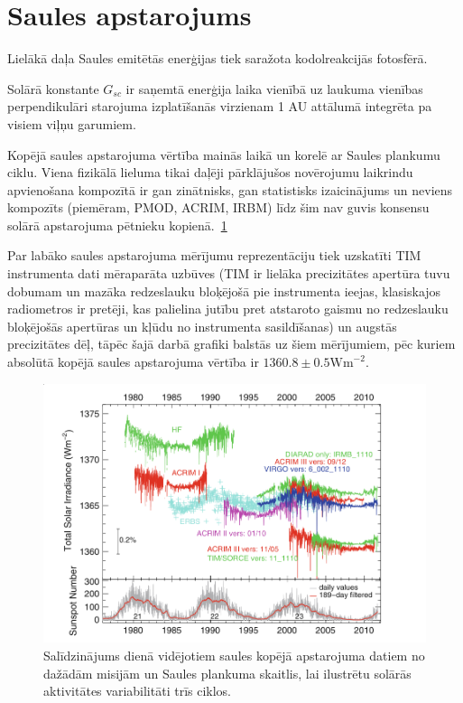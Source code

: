 
\section{Saules apstarojums}

Lielākā daļa Saules emitētās enerģijas tiek saražota kodolreakcijās fotosfērā.


Solārā konstante $G_{sc}$ ir saņemtā enerģija laika vienībā uz laukuma vienības perpendikulāri starojuma izplatīšanās virzienam 1 AU attālumā integrēta pa visiem viļņu garumiem.\cite{ThermalProcesses}

Kopējā saules apstarojuma vērtība mainās laikā un korelē ar Saules plankumu ciklu.
Viena fizikālā lieluma tikai daļēji pārklājušos novērojumu laikrindu apvienošana kompozītā ir gan zinātnisks, gan statistisks izaicinājums un neviens kompozīts (piemēram, PMOD, ACRIM, IRBM) līdz šim nav guvis konsensu solārā apstarojuma pētnieku kopienā.~\ref{fig:TSI_misijas}

Par labāko saules apstarojuma mērījumu reprezentāciju tiek uzskatīti TIM instrumenta dati mēraparāta uzbūves (TIM ir lielāka precizitātes apertūra tuvu dobumam un mazāka redzeslauku bloķējošā pie instrumenta ieejas, klasiskajos radiometros ir pretēji, kas palielina jutību pret atstaroto gaismu no redzeslauku bloķējošās apertūras un kļūdu no instrumenta sasildīšanas) un augstās precizitātes dēļ, tāpēc šajā darbā grafiki balstās uz šiem mērījumiem, pēc kuriem absolūtā kopējā saules apstarojuma vērtība ir $1360.8 \pm 0.5 \textrm{Wm}^{-2}$.\cite{Frohlich2012}

\begin{figure}[h]
    \centering
    \includegraphics[width=0.6\linewidth]{figures/misc/TSI_misijas.png}
    \caption{Salīdzinājums dienā vidējotiem saules kopējā apstarojuma datiem no dažādām misijām un Saules plankuma skaitlis, lai ilustrētu solārās aktivitātes variabilitāti trīs ciklos. \cite{Frohlich2012}}
    \label{fig:TSI_misijas}
\end{figure}

